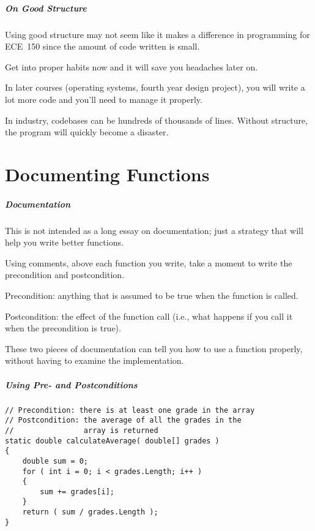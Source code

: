 \begin{frame}
\frametitle{On Good Structure}
Using good structure may not seem like it makes a difference in programming for ECE~150 since the amount of code written is small.

Get into proper habits now and it will save you headaches later on.

In later courses (operating systems, fourth year design project), you will write a lot more code and you'll need to manage it properly.

In industry, codebases can be hundreds of thousands of lines. Without structure, the program will quickly become a disaster.

\end{frame}

\part{Documenting Functions}
\begin{frame}\partpage\end{frame}

\begin{frame}
\frametitle{Documentation}
This is not intended as a long essay on documentation; just a strategy that will help you write better functions.

Using comments, above each function you write, take a moment to write the \alert{precondition} and \alert{postcondition}.

Precondition: anything that is assumed to be true when the function is called. 

Postcondition: the effect of the function call (i.e., what happens if you call it when the precondition is true).

These two pieces of documentation can tell you how to use a function properly, without having to examine the implementation.

\end{frame}

\begin{frame}[fragile]
\frametitle{Using Pre- and Postconditions}

\begin{verbatim}
// Precondition: there is at least one grade in the array
// Postcondition: the average of all the grades in the 
//                array is returned
static double calculateAverage( double[] grades )
{
    double sum = 0;
    for ( int i = 0; i < grades.Length; i++ )
    {
        sum += grades[i];
    }
    return ( sum / grades.Length ); 
}
\end{verbatim}

\end{frame}

